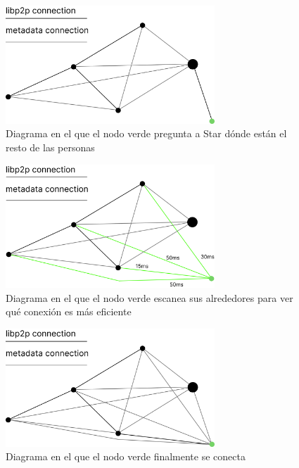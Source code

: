 \begin{figure}[h!]
    \centering
    \includegraphics[width=0.7\textwidth]{Figures/Green ask Star for instructions.png}
    \caption{Diagrama en el que el nodo verde pregunta a Star dónde están el resto de las personas}
    \label{fg:asking_star}
\end{figure}
\begin{figure}[h!]
    \centering
    \includegraphics[width=0.7\textwidth]{Figures/Green scans the other peers.png}
    \caption{Diagrama en el que el nodo verde escanea sus alrededores para ver qué conexión es más eficiente}
    \label{fg:scanning_area}
\end{figure}
\begin{figure}[h!]
    \centering
    \includegraphics[width=0.7\textwidth]{Figures/Green finally joins(1).png}
    \caption{Diagrama en el que el nodo verde finalmente se conecta}
    \label{fg:connecting}
\end{figure}
